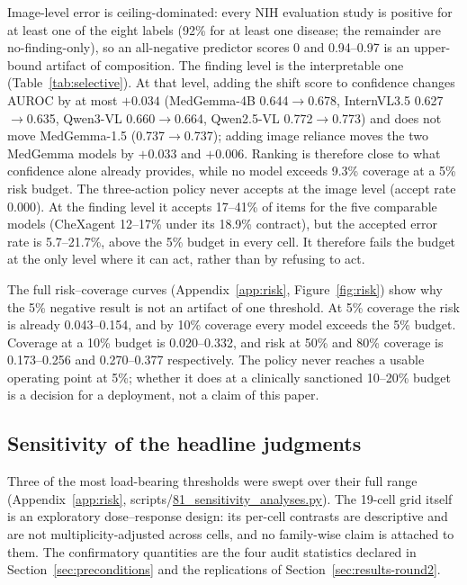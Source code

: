 Image-level error is ceiling-dominated: every NIH evaluation study is positive for at least one of the eight labels (92\% for at least one disease; the remainder are no-finding-only), so an all-negative predictor scores 0 and 0.94--0.97 is an upper-bound artifact of composition. The finding level is the interpretable one (Table~\ref{tab:selective}). At that level, adding the shift score to confidence changes AUROC by at most $+0.034$ (MedGemma-4B 0.644$\rightarrow$0.678, InternVL3.5 0.627$\rightarrow$0.635, Qwen3-VL 0.660$\rightarrow$0.664, Qwen2.5-VL 0.772$\rightarrow$0.773) and does not move MedGemma-1.5 (0.737$\rightarrow$0.737); adding image reliance moves the two MedGemma models by $+0.033$ and $+0.006$. Ranking is therefore close to what confidence alone already provides, while no model exceeds 9.3\% coverage at a 5\% risk budget. The three-action policy never accepts at the image level (accept rate 0.000). At the finding level it accepts 17--41\% of items for the five comparable models (CheXagent 12--17\% under its 18.9\% contract), but the accepted error rate is 5.7--21.7\%, above the 5\% budget in every cell. It therefore fails the budget at the only level where it can act, rather than by refusing to act.

The full risk--coverage curves (Appendix~\ref{app:risk}, Figure~\ref{fig:risk}) show why the 5\% negative result is not an artifact of one threshold. At 5\% coverage the risk is already 0.043--0.154, and by 10\% coverage every model exceeds the 5\% budget. Coverage at a 10\% budget is 0.020--0.332, and risk at 50\% and 80\% coverage is 0.173--0.256 and 0.270--0.377 respectively. The policy never reaches a usable operating point at 5\%; whether it does at a clinically sanctioned 10--20\% budget is a decision for a deployment, not a claim of this paper.



\subsection{Sensitivity of the headline judgments}
\label{sec:sensitivity}

Three of the most load-bearing thresholds were swept over their full range (Appendix~\ref{app:risk}, scripts/\url{81_sensitivity_analyses.py}). The 19-cell grid itself is an exploratory dose--response design: its per-cell contrasts are descriptive and are not multiplicity-adjusted across cells, and no family-wise claim is attached to them. The confirmatory quantities are the four audit statistics declared in Section~\ref{sec:preconditions} and the replications of Section~\ref{sec:results-round2}.

